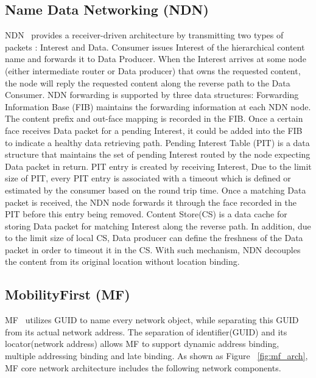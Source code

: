 \subsection{Name Data Networking (NDN)}
NDN~\cite{zhang2014named} provides a receiver-driven architecture by transmitting two types of packets : Interest and Data. Consumer issues Interest of the hierarchical content name and forwards it to Data Producer. When the Interest arrives at some node (either intermediate router or Data producer) that owns the requested content, the node will reply the requested content along the reverse path to the Data Consumer.
NDN forwarding is supported by three data structures:
Forwarding Information Base (FIB) maintains the forwarding information at each NDN node. The content prefix and out-face mapping is recorded in the FIB. Once a certain face receives Data packet for a pending Interest,  it could be added into the FIB to indicate a healthy data retrieving path. Pending Interest Table (PIT) is a data structure that maintains the set of pending Interest routed by the node expecting Data packet in return. PIT entry is created by receiving Interest,
Due to the limit size of PIT, every PIT entry is associated with a timeout which is defined or estimated by the consumer based on the round trip time. Once a matching Data packet is received, the NDN node forwards it through the face recorded in the PIT before this entry being removed. Content Store(CS) is a data cache for storing Data packet for matching Interest along the reverse path. In addition, due to the limit size of local CS, Data producer can define the freshness of the Data packet in order to timeout it in the CS. With such mechanism,
NDN decouples the content from its original location without location binding.


\subsection{MobilityFirst (MF)}\label{sec:intro_mf}
MF~\cite{raychaudhuri2012mobilityfirst} utilizes GUID to name every network object, while separating this GUID from its actual network address. The separation of identifier(GUID) and its locator(network address)  allows MF to support dynamic address binding, multiple addressing binding and late binding. As shown as Figure ~\ref{fig:mf_arch}, MF core network architecture includes the following network components.

